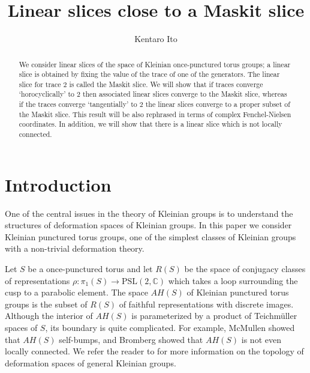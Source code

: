 \documentclass[12pt]{article}
\title{Linear slices close to a Maskit slice}
\author{Kentaro Ito}
\theoremstyle{plain}
\theoremstyle{definition}
\theoremstyle{remark}
\newcommand{\psl}{{\mathrm{PSL}}(2,\mathbb C)}
\begin{document}
\maketitle

\begin{abstract}
We consider linear slices of the space of Kleinian once-punctured torus groups; 
a linear slice is obtained by fixing the value of the trace of one of the generators.  
The linear slice for trace $2$ is called the Maskit slice. 
We will show that if traces converge `horocyclically' to $2$ 
then associated linear slices 
converge to the Maskit slice, whereas if the traces converge 
`tangentially' to $2$ the linear slices converge to a proper subset of the Maskit slice. 
This result will  be also rephrased in terms of complex Fenchel-Nielsen coordinates. 
In addition, we will show that there is a linear slice which is not  locally connected. 
\end{abstract}

\section{Introduction}

One of the central issues in the theory of Kleinian groups is to understand the structures 
of deformation spaces of Kleinian groups. 
In this paper we consider Kleinian punctured torus groups, 
one of the simplest classes of Kleinian groups with a non-trivial deformation theory. 

Let $S$ be a once-punctured torus and let $R(S)$ be the space of conjugacy classes of representations 
$\rho:\pi_1(S) \to \psl$ which takes a loop surrounding the cusp to a parabolic element. 
The space $AH(S)$ of Kleinian punctured torus groups is the subset of $R(S)$  of 
faithful representations with discrete images. 
Although the interior of $AH(S)$  
is parameterized by a product of Teichm\"{u}ller spaces of $S$, 
its boundary is quite complicated. 
For example, McMullen \cite{Mc2} showed that $AH(S)$ self-bumps,  
and Bromberg \cite{Br} showed 
that $AH(S)$ is not even locally connected. 
We refer the reader to \cite{Ca}  
for more information on the topology of 
deformation spaces of general Kleinian groups. 
\end{document}
